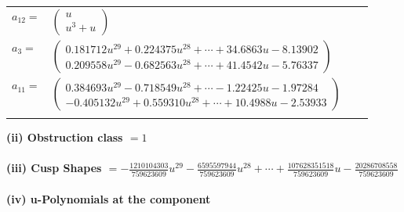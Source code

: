 \documentclass[1p]{elsarticle_modified}
\theoremstyle{definition}
\begin{document}
\begin{tabular}{m{7pt} m{180pt} m{7pt} m{180pt} }
\flushright $a_{12}=$&$\begin{pmatrix}u\\u^3+u\end{pmatrix}$ \\
\flushright $a_{3}=$&$\begin{pmatrix}0.181712 u^{29}+0.224375 u^{28}+\cdots+34.6863 u-8.13902\\0.209558 u^{29}-0.682563 u^{28}+\cdots+41.4542 u-5.76337\end{pmatrix}$ \\
\flushright $a_{11}=$&$\begin{pmatrix}0.384693 u^{29}-0.718549 u^{28}+\cdots-1.22425 u-1.97284\\-0.405132 u^{29}+0.559310 u^{28}+\cdots+10.4988 u-2.53933\end{pmatrix}$\\&\end{tabular}
\flushleft \textbf{(ii) Obstruction class $= 1$}\\~\\
\flushleft \textbf{(iii) Cusp Shapes $= -\frac{1210104303}{759623609} u^{29}-\frac{6595597944}{759623609} u^{28}+\cdots+\frac{107628351518}{759623609} u-\frac{20286708558}{759623609}$}\\~\\
\newpage\renewcommand{\arraystretch}{1}
\flushleft \textbf{(iv) u-Polynomials at the component}\newline \\
\end{document}
